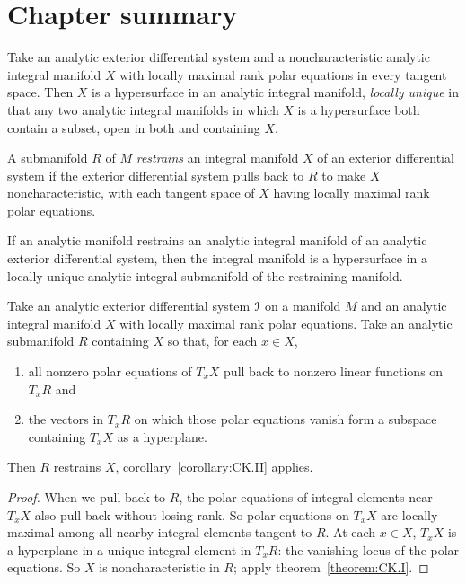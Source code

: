 \section{Chapter summary}
\begin{theorem}%
[Cartan--K\"ahler \Romanbar{1}]%
%
%
\label{theorem:CK.I}
Take an analytic exterior differential system and a noncharacteristic analytic integral manifold \(X\) with locally maximal rank polar equations in every tangent space.
Then \(X\) is a hypersurface in an analytic integral manifold, \emph{locally unique} in that any two analytic integral manifolds in which \(X\) is a hypersurface both contain a subset, open in both and containing \(X\).
\end{theorem}
A submanifold \(R\) of \(M\) \emph{restrains} an integral manifold \(X\) of an exterior differential system if the exterior differential system pulls back to \(R\) to make \(X\) noncharacteristic, with each tangent space of \(X\) having locally maximal rank polar equations.
\begin{corollary}\label{corollary:CK.II}
If an analytic manifold restrains an analytic integral manifold of an analytic exterior differential system, then the integral manifold is a hypersurface in a locally unique analytic integral submanifold of the restraining manifold.
\end{corollary}
\begin{theorem}%
[Cartan--K\"ahler \Romanbar{2}]%
%
%
\label{theorem:CK.II}
Take an analytic exterior differential system \(\mathcal{I}\) on a manifold \(M\) and an analytic integral manifold \(X\) with locally maximal rank polar equations.
Take an analytic submanifold \(R\) containing \(X\) so that, for each \(x \in X\), 
\begin{enumerate}
\item
all nonzero polar equations of \(T_x X\) pull back to nonzero linear functions on \(T_x R\) and
\item
the vectors in \(T_x R\) on which those polar equations vanish form a subspace containing \(T_x X\) as a hyperplane.
\end{enumerate}
Then \(R\) restrains \(X\), corollary~\ref{corollary:CK.II} applies.
\end{theorem}
\begin{proof}
When we pull back to \(R\), the polar equations of integral elements  near \(T_x X\) also pull back without losing rank.
So polar equations on \(T_x X\) are locally maximal among all nearby integral elements tangent to \(R\).
At each \(x\in X\), \(T_x X\) is a hyperplane in a unique integral element in \(T_x R\): the vanishing locus of the polar equations.
So \(X\) is noncharacteristic in \(R\); apply theorem~\vref{theorem:CK.I}.
\end{proof}
